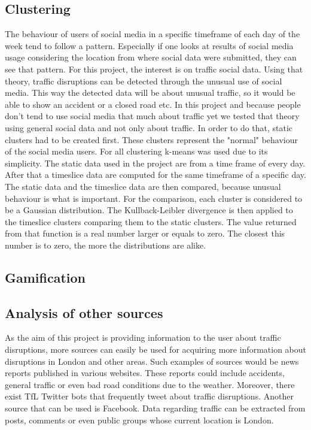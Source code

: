 \subsection{Clustering}
The behaviour of users of social media in a specific timeframe of each day of
the week tend to follow a pattern. Especially if one looks at results of social
media usage considering the location from where social data were submitted,
they can see that pattern. For this project, the interest is on traffic social
data.
Using that theory, traffic disruptions can be detected through the unusual use
of social media. This way the detected data will be about unusual traffic, so
it would be able to show an accident or a closed road etc. In this project and
because people don't tend to use social media that much about traffic yet we
tested that theory using general social data and not only about traffic.
In order to do that, static clusters had to be created first. These clusters
represent the "normal" behaviour of the social media users. For all clustering
k-means was used due to its simplicity. The static data used in the project are
from a time frame of every day. After that a timeslice data are computed for
the same timeframe of a specific day.
The static data and the timeslice data are then compared, because unusual
behaviour is what is important. For the comparison, each cluster is considered
to be a Gaussian distribution. The Kullback-Leibler divergence is then applied
to the timeslice clusters comparing them to the static clusters. The value
returned from that function is a real number larger or equals to zero. The
closest this number is to zero, the more the distributions are alike.

\subsection{Gamification}

\subsection{Analysis of other sources}
As the aim of this project is providing information to the user about traffic disruptions, more sources can 
easily be used for acquiring more information about disruptions in London and other areas. Such examples 
of sources would be news reports published in various websites. These reports could include accidents, general traffic or even 
bad road conditions due to the weather. Moreover, there exist TfL Twitter bots that frequently tweet
about traffic disruptions. Another source that can be used is Facebook. Data regarding traffic can be
extracted from posts, comments or even public groups whose current location is London.

